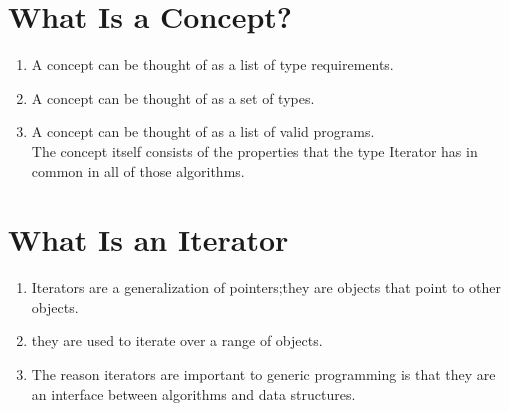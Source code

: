 \documentclass[UTF8]{article}
\begin{document}
\section{What Is a Concept?}%
\label{sec:what_is_a_concept_}
    \begin{enumerate}
      \item A concept can be thought of as a list of type requirements.
      \item A concept can be thought of as a set of types.
      \item A concept can be thought of as a list of valid programs.\\ The concept itself consists of the properties that the type Iterator has in common in all of those algorithms.
    \end{enumerate}
\section{What Is an Iterator}%
\label{sec:what_is_an_iterator}
  \begin{enumerate}
    \item Iterators are a generalization of pointers;they are objects that point to other objects.
    \item they are used to iterate over a range of objects.
    \item The reason iterators are important to generic programming is that they are an interface between algorithms and data structures.
  \end{enumerate}


    
\end{document}
